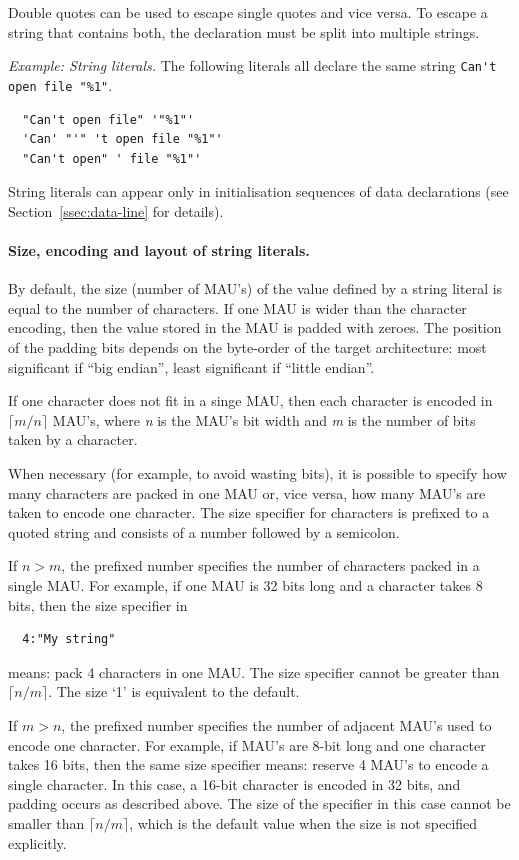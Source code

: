 \documentclass[a4paper,twoside]{tceusermanual}
\begin{document}
Double quotes can be used to escape single quotes and vice versa. To escape
a string that contains both, the declaration must be split into multiple
strings.

\emph{Example: String literals.}
The following literals all declare the same string 
\verb|Can't open file "%1"|.
%
\begin{verbatim}
  "Can't open file" '"%1"'
  'Can' "'" 't open file "%1"'
  "Can't open" ' file "%1"'
\end{verbatim}

String literals can appear only in initialisation sequences of data
declarations (see Section~\ref{ssec:data-line} for details).

\paragraph{Size, encoding and layout of string literals.}
By default, the size (number of MAU's) of the value defined by a string
literal is equal to the number of characters. If one MAU is wider than the
character encoding, then the value stored in the MAU is padded with zeroes.
The position of the padding bits depends on the byte-order of the target
architecture: most significant if ``big endian'', least significant if
``little endian''.

If one character does not fit in a singe MAU, then each character is encoded
in $\lceil m/n \rceil$ MAU's, where \emph{n} is the MAU's bit width and
\emph{m} is the number of bits taken by a character.

When necessary (for example, to avoid wasting bits), it is possible to
specify how many characters are packed in one MAU or, vice versa, how many
MAU's are taken to encode one character.
%
The size specifier for characters is prefixed to a quoted string and
consists of a number followed by a semicolon.

If $n > m$, the prefixed number specifies the number of characters packed in
a single MAU. For example, if one MAU is 32 bits long and a character takes
8 bits, then the size specifier in
\begin{verbatim}
  4:"My string"
\end{verbatim}
means: pack 4 characters in one MAU. The size specifier cannot be greater
than $\lceil n/m \rceil$. The size `1' is equivalent to the default.

If $m > n$, the prefixed number specifies the number of adjacent MAU's used
to encode one character. For example, if MAU's are 8-bit long and one
character takes 16 bits, then the same size specifier means: reserve 4 MAU's
to encode a single character. In this case, a 16-bit character is encoded in
32 bits, and padding occurs as described above. The size of the specifier in
this case cannot be smaller than $\lceil n/m \rceil$, which is the default
value when the size is not specified explicitly.
\end{document}
